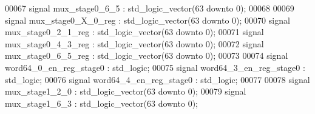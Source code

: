 \begin{DoxyCode}
00067 \textcolor{keywordflow}{signal} \textcolor{vhdlchar}{mux_stage0_6_5}         \textcolor{vhdlchar}{:} \textcolor{comment}{std\_logic\_vector}\textcolor{vhdlchar}{(}\textcolor{vhdllogic}{}\textcolor{vhdllogic}{63} \textcolor{keywordflow}{downto} \textcolor{vhdllogic}{}\textcolor{vhdllogic}{0}\textcolor{vhdlchar}{)};
00068 
00069 \textcolor{keywordflow}{signal} \textcolor{vhdlchar}{mux_stage0_X_0_reg}     \textcolor{vhdlchar}{:} \textcolor{comment}{std\_logic\_vector}\textcolor{vhdlchar}{(}\textcolor{vhdllogic}{}\textcolor{vhdllogic}{63} \textcolor{keywordflow}{downto} \textcolor{vhdllogic}{}\textcolor{vhdllogic}{0}\textcolor{vhdlchar}{)};
00070 \textcolor{keywordflow}{signal} \textcolor{vhdlchar}{mux_stage0_2_1_reg}     \textcolor{vhdlchar}{:} \textcolor{comment}{std\_logic\_vector}\textcolor{vhdlchar}{(}\textcolor{vhdllogic}{}\textcolor{vhdllogic}{63} \textcolor{keywordflow}{downto} \textcolor{vhdllogic}{}\textcolor{vhdllogic}{0}\textcolor{vhdlchar}{)};
00071 \textcolor{keywordflow}{signal} \textcolor{vhdlchar}{mux_stage0_4_3_reg}     \textcolor{vhdlchar}{:} \textcolor{comment}{std\_logic\_vector}\textcolor{vhdlchar}{(}\textcolor{vhdllogic}{}\textcolor{vhdllogic}{63} \textcolor{keywordflow}{downto} \textcolor{vhdllogic}{}\textcolor{vhdllogic}{0}\textcolor{vhdlchar}{)};
00072 \textcolor{keywordflow}{signal} \textcolor{vhdlchar}{mux_stage0_6_5_reg}     \textcolor{vhdlchar}{:} \textcolor{comment}{std\_logic\_vector}\textcolor{vhdlchar}{(}\textcolor{vhdllogic}{}\textcolor{vhdllogic}{63} \textcolor{keywordflow}{downto} \textcolor{vhdllogic}{}\textcolor{vhdllogic}{0}\textcolor{vhdlchar}{)};
00073 
00074 \textcolor{keywordflow}{signal} \textcolor{vhdlchar}{word64_0_en_reg_stage0} \textcolor{vhdlchar}{:} \textcolor{comment}{std\_logic};
00075 \textcolor{keywordflow}{signal} \textcolor{vhdlchar}{word64_3_en_reg_stage0} \textcolor{vhdlchar}{:} \textcolor{comment}{std\_logic};
00076 \textcolor{keywordflow}{signal} \textcolor{vhdlchar}{word64_4_en_reg_stage0} \textcolor{vhdlchar}{:} \textcolor{comment}{std\_logic};
00077 
00078 \textcolor{keywordflow}{signal} \textcolor{vhdlchar}{mux_stage1_2_0}         \textcolor{vhdlchar}{:} \textcolor{comment}{std\_logic\_vector}\textcolor{vhdlchar}{(}\textcolor{vhdllogic}{}\textcolor{vhdllogic}{63} \textcolor{keywordflow}{downto} \textcolor{vhdllogic}{}\textcolor{vhdllogic}{0}\textcolor{vhdlchar}{)};
00079 \textcolor{keywordflow}{signal} \textcolor{vhdlchar}{mux_stage1_6_3}         \textcolor{vhdlchar}{:} \textcolor{comment}{std\_logic\_vector}\textcolor{vhdlchar}{(}\textcolor{vhdllogic}{}\textcolor{vhdllogic}{63} \textcolor{keywordflow}{downto} \textcolor{vhdllogic}{}\textcolor{vhdllogic}{0}\textcolor{vhdlchar}{)};

\end{DoxyCode}
